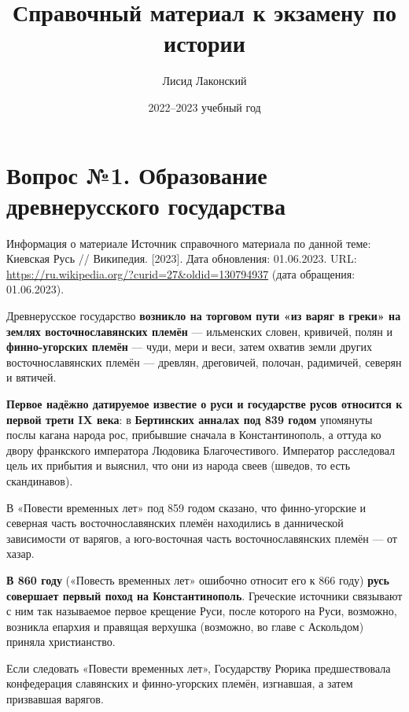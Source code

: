 \documentclass{article}
\title{Справочный материал к экзамену по истории}
\author{Лисид Лаконский}
\date{2022–2023 учебный год}
\begin{document}
\raggedright

\maketitle
\tableofcontents
\pagebreak

\section{Вопрос №1. Образование древнерусского государства}

\begin{bclogo}[logo=\bcinfo, couleurBarre=orange, noborder=true, couleur=white]{Информация о материале}
    Источник справочного материала по данной теме: Киевская Русь // Википедия. [2023]. Дата обновления: 01.06.2023. URL: \url{https://ru.wikipedia.org/?curid=27&oldid=130794937} (дата обращения: 01.06.2023). 
\end{bclogo}

Древнерусское государство \textbf{возникло на торговом пути «из варяг в греки» на землях восточнославянских племён} — ильменских словен, кривичей, полян и \textbf{финно-угорских племён} — чуди, мери и веси, затем охватив земли других восточнославянских племён — древлян, дреговичей, полочан, радимичей, северян и вятичей.

\hfill 

\textbf{Первое надёжно датируемое известие о руси и государстве русов относится к первой трети IX века}: в \textbf{Бертинских анналах под 839 годом} упомянуты послы кагана народа рос, прибывшие сначала в Константинополь, а оттуда ко двору франкского императора Людовика Благочестивого. Император расследовал цель их прибытия и выяснил, что они из народа свеев (шведов, то есть скандинавов).

В «Повести временных лет» под 859 годом сказано, что финно-угорские и северная часть восточнославянских племён находились в даннической зависимости от варягов, а юго-восточная часть восточнославянских племён — от хазар.

\hfill

\textbf{В 860 году} («Повесть временных лет» ошибочно относит его к 866 году) \textbf{русь совершает первый поход на Константинополь}. Греческие источники связывают с ним так называемое первое крещение Руси, после которого на Руси, возможно, возникла епархия и правящая верхушка (возможно, во главе с Аскольдом) приняла христианство.

Если следовать «Повести временных лет», Государству Рюрика предшествовала конфедерация славянских и финно-угорских племён, изгнавшая, а затем призвавшая варягов.
\end{document}
